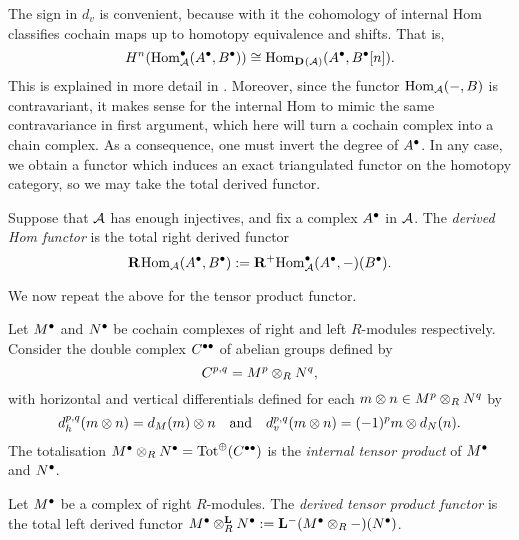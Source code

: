 The sign in $d_v$ is convenient, because with it the cohomology of
internal Hom classifies cochain maps up to homotopy equivalence and shifts.
That is,
\[
  H^n(\Hom^{\bullet}_{\abcat{A}}(\cochaincomp{A}, \cochaincomp{B}))
  \cong
  \Hom_{\dercat{\abcat{A}}}(\cochaincomp{A}, \cochaincomp{B}[n]).
\]
This is explained in more detail in \cite[Section~10.7]{weibel}.
Moreover, since the functor $\Hom_{\abcat{A}}(-, B)$ is contravariant,
it makes sense for the internal Hom to mimic the same contravariance
in first argument, which here will turn a cochain complex into a chain complex.
As a consequence, one must invert the degree of $\cochaincomp{A}$.
In any case, we obtain a functor which induces an exact triangulated
functor on the homotopy category, so we may take the total derived functor.

\begin{definition}
  Suppose that $\abcat{A}$ has enough injectives, and fix a complex
  $\cochaincomp{A}$ in $\abcat{A}$.
  The \emph{derived Hom functor} is the total right derived functor
  \[
    \derhom_{\abcat{A}}(\cochaincomp{A}, \cochaincomp{B})
    := \rightderfunc[+]{\Hom^{\bullet}_{\abcat{A}}(\cochaincomp{A},
    -)}(\cochaincomp{B}).
  \]
  \vspace{-24pt}
\end{definition}

We now repeat the above for the tensor product functor.

\begin{definition}
  Let $\cochaincomp{M}$ and $\cochaincomp{N}$ be cochain complexes of
  right and left $R$-modules respectively.
  Consider the double complex $\cochainbicomp{C}$ of abelian groups defined by
  \[
    C^{p, q} = M^{p} \tensor_R N^{q},
  \]
  with horizontal and vertical differentials defined for each $m
  \tensor n \in M^{p} \tensor_R N^{q}$ by
  \[
    d_h^{p, q}(m \tensor n) = d_M(m) \tensor n
    \mathand
    d_v^{p, q}(m \tensor n) = (-1)^p m \tensor d_N(n).
  \]
  The totalisation $\cochaincomp{M} \tensor_R \cochaincomp{N} =
  \totsumcomp{\cochainbicomp{C}}$ is the \emph{internal tensor
  product} of $\cochaincomp{M}$ and $\cochaincomp{N}$.
\end{definition}

\begin{definition}
  Let $\cochaincomp{M}$ be a complex of right $R$-modules.
  The \emph{derived tensor product functor} is the total left derived
  functor $\dertensor{R}{\cochaincomp{M}}{\cochaincomp{N}} :=
  \leftderfunc[-]{(\cochaincomp{M} \tensor_R -)}(\cochaincomp{N})$.
\end{definition}

